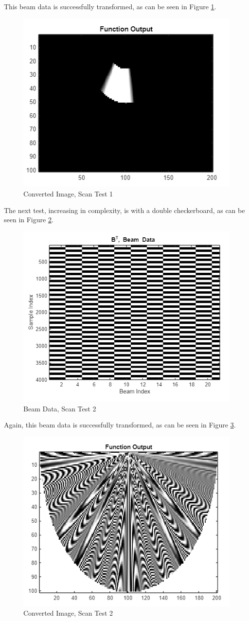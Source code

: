 This beam data is successfully transformed, as can be seen in Figure \ref{fig:scan_block_out}.

\begin{figure}[H]
    \centering
    \includegraphics[width=0.5\linewidth]{figures/scan_block_out.png}
    \caption{Converted Image, Scan Test 1}
    \label{fig:scan_block_out}
\end{figure}

The next test, increasing in complexity, is with a double checkerboard, as can be seen in Figure \ref{fig:scan_checker2}.

\begin{figure}[H]
    \centering
    \includegraphics[width=0.5\linewidth]{figures/scan_checker2.png}
    \caption{Beam Data, Scan Test 2}
    \label{fig:scan_checker2}
\end{figure}

Again, this beam data is successfully transformed, as can be seen in Figure \ref{fig:scan_checker2_out}.

\begin{figure}[H]
    \centering
    \includegraphics[width=0.5\linewidth]{figures/scan_checker2_out.png}
    \caption{Converted Image, Scan Test 2}
    \label{fig:scan_checker2_out}
\end{figure}

